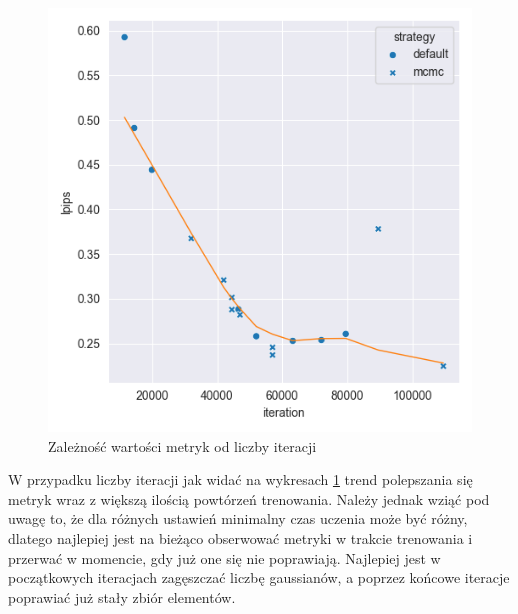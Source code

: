 \begin{figure}[h!]
\begin{minipage}{0.3\textwidth}
    \end{minipage}
    \hfill
    \begin{minipage}{0.3\textwidth}
        \centering
        \includegraphics[width=\textwidth]{img/gs_metrics/lpips_iteration.png}
    \end{minipage}
    \caption{Zależność wartości metryk od liczby iteracji}
    \label{fig:iter_gs_metrics}
\end{figure}

W przypadku liczby iteracji jak widać na wykresach \ref{fig:iter_gs_metrics} trend polepszania się metryk wraz z większą ilością powtórzeń trenowania. Należy jednak wziąć pod uwagę to, że dla różnych ustawień minimalny czas uczenia może być różny, dlatego najlepiej jest na bieżąco obserwować metryki w trakcie trenowania i przerwać w momencie, gdy już one się nie poprawiają. Najlepiej jest w początkowych iteracjach zagęszczać liczbę gaussianów, a poprzez końcowe iteracje poprawiać już stały zbiór elementów. 

